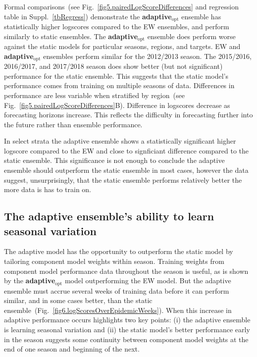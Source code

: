 \documentclass[12pt]{article}
\def\adaptOpt{\textbf{adaptive$_{\text{opt}}$ }}
\begin{document}
Formal comparisons~(see Fig.~\ref{fig5.pairedLogScoreDifferences} and regression table in Suppl.~\ref{tbRegress}) demonstrate the \adaptOpt ensemble has statistically higher logscores compared to the EW ensembles, and perform similarly to static ensembles.
The \adaptOpt ensemble does perform worse against the static models for particular seasons, regions, and targets.
EW and \adaptOpt ensembles perform similar for the 2012/2013 season.
The 2015/2016, 2016/2017, and 2017/2018 season does show better (but not significant) performance for the static ensemble.
This suggests that the static model's performance comes from training on multiple seasons of data.
Differences in performance are less variable when stratified by region~(see Fig.~\ref{fig5.pairedLogScoreDifferences}B).
Difference in logscores decrease as forecasting horizons increase.
This reflects the difficulty in forecasting further into the future rather than ensemble performance.

In select strata the adaptive ensemble shows a statistically significant higher logscore compared to the EW and close to signficiant difference compared to the static ensemble. 
This significance is not enough to conclude the adaptive ensemble should outperform the static ensemble in most cases, however the data suggest, unsurprisingly, that the static ensemble performs relatively better the more data is has to train on.

\subsection{The adaptive ensemble's ability to learn seasonal variation}

The adaptive model has the opportunity to outperform the static model by tailoring component model weights within season.
Training weights from component model performance data throughout the season is useful, as is shown by the \adaptOpt model outperforming the EW model.
But the adaptive ensemble must accrue several weeks of training data before it can perform similar, and in some cases better, than the static ensemble~(Fig.~\ref{fig6.logScoresOverEpidemicWeeks}).
When this increase in adaptive performance occurs highlights two key points: (i) the adaptive ensemble is learning seasonal variation and (ii) the static model's better performance early in the season suggests some continuity between component model weights at the end of one season and beginning of the next.
\end{document}
